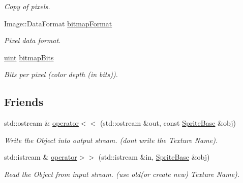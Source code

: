 \begin{DoxyCompactItemize}
\begin{DoxyCompactList}\small\item\em Copy of pixels. \item\end{DoxyCompactList}\item 
\hypertarget{class_f2_c_1_1_sprite_base_a3f77c0311c6528deddc24e09bd132011}{
Image::DataFormat \hyperlink{class_f2_c_1_1_sprite_base_a3f77c0311c6528deddc24e09bd132011}{bitmapFormat}}
\label{class_f2_c_1_1_sprite_base_a3f77c0311c6528deddc24e09bd132011}

\begin{DoxyCompactList}\small\item\em Pixel data format. \item\end{DoxyCompactList}\item 
\hypertarget{class_f2_c_1_1_sprite_base_aace539201a27ea859def56d690cc47f9}{
\hyperlink{namespace_f2_c_a58be2bac9eb3e3c99cb41b6008bf4fae}{uint} \hyperlink{class_f2_c_1_1_sprite_base_aace539201a27ea859def56d690cc47f9}{bitmapBits}}
\label{class_f2_c_1_1_sprite_base_aace539201a27ea859def56d690cc47f9}

\begin{DoxyCompactList}\small\item\em Bits per pixel (color depth (in bits)). \item\end{DoxyCompactList}\end{DoxyCompactItemize}
\subsection*{Friends}
\begin{DoxyCompactItemize}
\item 
std::ostream \& \hyperlink{class_f2_c_1_1_sprite_base_a433229722dd7051ac692e97ea6615ff1}{operator$<$$<$} (std::ostream \&out, const \hyperlink{class_f2_c_1_1_sprite_base}{SpriteBase} \&obj)
\begin{DoxyCompactList}\small\item\em Write the Object into output stream. (dont write the Texture Name). \item\end{DoxyCompactList}\item 
std::istream \& \hyperlink{class_f2_c_1_1_sprite_base_a43308fc1b7b7558a8c58151bc5dd43fb}{operator$>$$>$} (std::istream \&in, \hyperlink{class_f2_c_1_1_sprite_base}{SpriteBase} \&obj)
\begin{DoxyCompactList}\small\item\em Read the Object from input stream. (use old(or create new) Texture Name). \item\end{DoxyCompactList}\end{DoxyCompactItemize}


